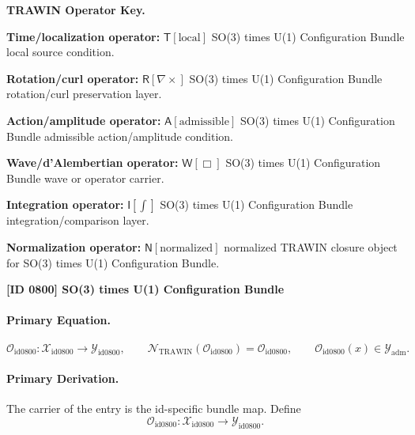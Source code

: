 \par\vspace{0.45\baselineskip}
\noindent\begin{minipage}[t]{\linewidth}
\begingroup
\small
\raggedright
\textbf{TRAWIN Operator Key.}\par
\noindent\textbf{Time/localization operator:} $\mathsf{T}\!\left[\mathrm{local}\right]$ SO(3) times U(1) Configuration Bundle local source condition.\par
\noindent\textbf{Rotation/curl operator:} $\mathsf{R}\!\left[\nabla\times\right]$ SO(3) times U(1) Configuration Bundle rotation/curl preservation layer.\par
\noindent\textbf{Action/amplitude operator:} $\mathsf{A}\!\left[\mathrm{admissible}\right]$ SO(3) times U(1) Configuration Bundle admissible action/amplitude condition.\par
\noindent\textbf{Wave/d'Alembertian operator:} $\mathsf{W}\!\left[\Box\right]$ SO(3) times U(1) Configuration Bundle wave or operator carrier.\par
\noindent\textbf{Integration operator:} $\mathsf{I}\!\left[\int\right]$ SO(3) times U(1) Configuration Bundle integration/comparison layer.\par
\noindent\textbf{Normalization operator:} $\mathsf{N}\!\left[\mathrm{normalized}\right]$ normalized TRAWIN closure object for SO(3) times U(1) Configuration Bundle.\par
\endgroup
\end{minipage}

\clearpage
\noindent\textbf{[ID 0800] SO(3) times U(1) Configuration Bundle}\par
\vspace{0.35em}
\paragraph{Primary Equation.}
\[
\mathcal{O}_{\mathrm{id0800}}:\mathcal{X}_{\mathrm{id0800}}\longrightarrow \mathcal{Y}_{\mathrm{id0800}},\qquad
\mathcal{N}_{\mathrm{TRAWIN}}(\mathcal{O}_{\mathrm{id0800}})=\mathcal{O}_{\mathrm{id0800}},\qquad
\mathcal{O}_{\mathrm{id0800}}(x)\in\mathcal{Y}_{\mathrm{adm}}.
\]

\paragraph{Primary Derivation.} The carrier of the entry is the id-specific bundle map.  Define\[
\mathcal{O}_{\mathrm{id0800}}:\mathcal{X}_{\mathrm{id0800}}\longrightarrow \mathcal{Y}_{\mathrm{id0800}}.
\]

